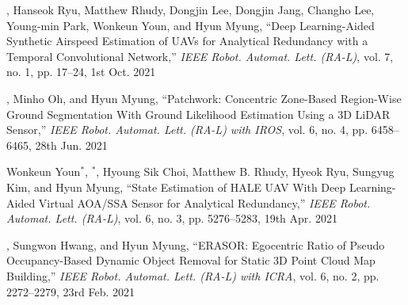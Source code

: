 \begin{pubSubsectionNum}
    \item \hyungtaelim, Hanseok Ryu, Matthew Rhudy, Dongjin Lee, Dongjin Jang, Changho Lee, Young-min Park, Wonkeun Youn, and Hyun Myung, ``Deep Learning-Aided Synthetic Airspeed Estimation of UAVs for Analytical Redundancy with a Temporal Convolutional Network,'' \textit{IEEE Robot. Automat. Lett. (RA-L)}, vol. 7, no. 1, pp. 17--24, 1st Oct. 2021
    \item \hyungtaelim, Minho Oh, and Hyun Myung, ``Patchwork: Concentric Zone-Based Region-Wise Ground Segmentation With Ground Likelihood Estimation Using a 3D LiDAR Sensor,'' \textit{IEEE Robot. Automat. Lett. (RA-L) with IROS}, vol. 6, no. 4, pp. 6458--6465, 28th Jun. 2021
    \item Wonkeun Youn$^{*}$, \hyungtaelim$^{*}$, Hyoung Sik Choi, Matthew B. Rhudy, Hyeok Ryu, Sungyug Kim, and Hyun Myung, ``State Estimation of HALE UAV With Deep Learning-Aided Virtual AOA/SSA Sensor for Analytical Redundancy,'' \textit{IEEE Robot. Automat. Lett. (RA-L)}, vol. 6, no. 3, pp. 5276--5283, 19th Apr. 2021
    \item \hyungtaelim, Sungwon Hwang, and Hyun Myung, ``ERASOR: Egocentric Ratio of Pseudo Occupancy-Based Dynamic Object Removal for Static 3D Point Cloud Map Building,'' \textit{IEEE Robot. Automat. Lett. (RA-L) with ICRA}, vol. 6, no. 2, pp. 2272--2279, 23rd Feb. 2021

\end{pubSubsectionNum}


